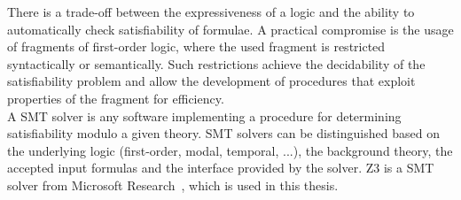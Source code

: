 There is a trade-off between the expressiveness of a logic and
the ability to automatically check satisfiability of formulae.
A practical compromise is the usage of fragments of first-order logic,
where the used fragment is restricted syntactically or semantically. %
Such restrictions achieve the decidability of the satisfiability problem and
allow the development of procedures that exploit properties of the fragment for efficiency.
\\
A SMT solver is any software implementing a procedure for determining satisfiability modulo a given theory.
SMT solvers can be distinguished based on the underlying logic (first-order, modal, temporal, ...),
the background theory, the accepted input formulas and the interface provided by the solver.
Z3 is a SMT solver from Microsoft Research~\cite{z3}, which is used in this thesis.

